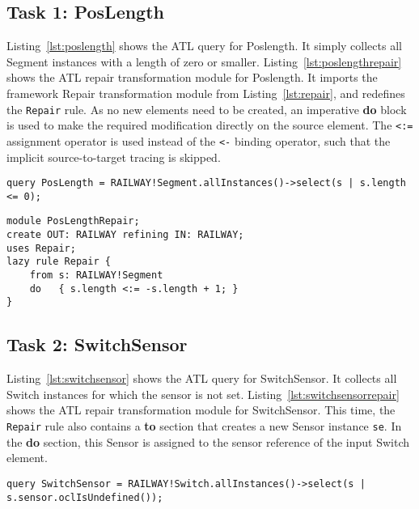 \documentclass[submission,copyright,creativecommons]{eptcs}
\begin{document}
\subsection{Task 1: PosLength}

Listing~\ref{lst:poslength} shows the ATL query for Poslength. It simply collects all Segment instances with a length of zero or smaller. Listing~\ref{lst:poslengthrepair} shows the ATL repair transformation module for Poslength. It imports the framework Repair transformation module from Listing~\ref{lst:repair}, and redefines the \texttt{Repair} rule. As no new elements need to be created, an imperative \textbf{do} block is used to make the required modification directly on the source element. The \texttt{<:=} assignment operator is used instead of the \texttt{<-} binding operator, such that the implicit source-to-target tracing is skipped.

\lstset{language=atl}
\begin{lstlisting}[float=htb, caption={PosLength query in ATL}, label=lst:poslength, captionpos=b, frame=tb, belowskip=-10pt]
query PosLength = RAILWAY!Segment.allInstances()->select(s | s.length <= 0);
\end{lstlisting}

\lstset{language=atl}
\begin{lstlisting}[float=htb, caption={PosLength repair transformation module in ATL}, label=lst:poslengthrepair, captionpos=b, frame=tb, belowskip=-10pt]
module PosLengthRepair;
create OUT: RAILWAY refining IN: RAILWAY;
uses Repair;
lazy rule Repair {
	from s: RAILWAY!Segment
	do   { s.length <:= -s.length + 1; }
}
\end{lstlisting}

\subsection{Task 2: SwitchSensor}

Listing~\ref{lst:switchsensor} shows the ATL query for SwitchSensor. It collects all Switch instances for which the sensor is not set. Listing~\ref{lst:switchsensorrepair} shows the ATL repair transformation module for SwitchSensor. This time, the \texttt{Repair} rule also contains a \textbf{to} section that creates a new Sensor instance \texttt{se}. In the \textbf{do} section, this Sensor is assigned to the sensor reference of the input Switch element.

\lstset{language=atl}
\begin{lstlisting}[float=htb, caption={SwitchSensor query in ATL}, label=lst:switchsensor, captionpos=b, frame=tb, belowskip=-10pt]
query SwitchSensor = RAILWAY!Switch.allInstances()->select(s | s.sensor.oclIsUndefined());
\end{lstlisting}
\end{document}
